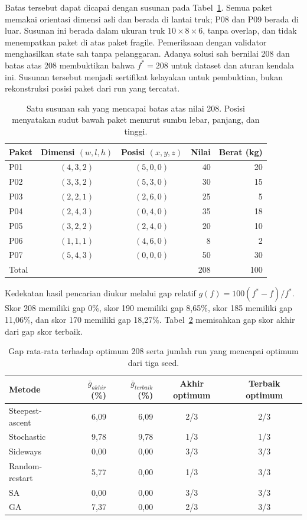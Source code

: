 \documentclass[12pt,a4paper]{article}
\begin{document}
Batas tersebut dapat dicapai dengan susunan pada Tabel~\ref{tab:sertifikat-optimum}. Semua paket memakai orientasi dimensi asli dan berada di lantai truk; P08 dan P09 berada di luar. Susunan ini berada dalam ukuran truk $10\times8\times6$, tanpa overlap, dan tidak menempatkan paket di atas paket fragile. Pemeriksaan dengan validator menghasilkan state sah tanpa pelanggaran. Adanya solusi sah bernilai 208 dan batas atas 208 membuktikan bahwa $f^*=208$ untuk dataset dan aturan kendala ini. Susunan tersebut menjadi sertifikat kelayakan untuk pembuktian, bukan rekonstruksi posisi paket dari run yang tercatat.
\begin{table}[htbp]
\centering
\small
\begin{tabular}{@{}l c c r r@{}}
\toprule
Paket & Dimensi $(w,l,h)$ & Posisi $(x,y,z)$ & Nilai & Berat (kg) \\
\midrule
P01 & $(4,3,2)$ & $(5,0,0)$ & 40 & 20 \\
P02 & $(3,3,2)$ & $(5,3,0)$ & 30 & 15 \\
P03 & $(2,2,1)$ & $(2,6,0)$ & 25 & 5 \\
P04 & $(2,4,3)$ & $(0,4,0)$ & 35 & 18 \\
P05 & $(3,2,2)$ & $(2,4,0)$ & 20 & 10 \\
P06 & $(1,1,1)$ & $(4,6,0)$ & 8 & 2 \\
P07 & $(5,4,3)$ & $(0,0,0)$ & 50 & 30 \\
\midrule
Total & & & 208 & 100 \\
\bottomrule
\end{tabular}
\caption{Satu susunan sah yang mencapai batas atas nilai 208. Posisi menyatakan sudut bawah paket menurut sumbu lebar, panjang, dan tinggi.}
\label{tab:sertifikat-optimum}
\end{table}

Kedekatan hasil pencarian diukur melalui gap relatif $g(f)=100(f^*-f)/f^*$. Skor 208 memiliki gap 0\%, skor 190 memiliki gap 8,65\%, skor 185 memiliki gap 11,06\%, dan skor 170 memiliki gap 18,27\%. Tabel~\ref{tab:gap-optimum} memisahkan gap skor akhir dari gap skor terbaik.
\begin{table}[htbp]
\centering
\small
\setlength{\tabcolsep}{4pt}
\begin{tabular}{@{}l r r c c@{}}
\toprule
Metode & $\bar g_{akhir}$ (\%) & $\bar g_{terbaik}$ (\%) & Akhir optimum & Terbaik optimum \\
\midrule
Steepest-ascent & 6,09 & 6,09 & 2/3 & 2/3 \\
Stochastic & 9,78 & 9,78 & 1/3 & 1/3 \\
Sideways & 0,00 & 0,00 & 3/3 & 3/3 \\
Random-restart & 5,77 & 0,00 & 1/3 & 3/3 \\
SA & 0,00 & 0,00 & 3/3 & 3/3 \\
GA & 7,37 & 0,00 & 2/3 & 3/3 \\
\bottomrule
\end{tabular}
\caption{Gap rata-rata terhadap optimum 208 serta jumlah run yang mencapai optimum dari tiga seed.}
\label{tab:gap-optimum}
\end{table}
\end{document}
